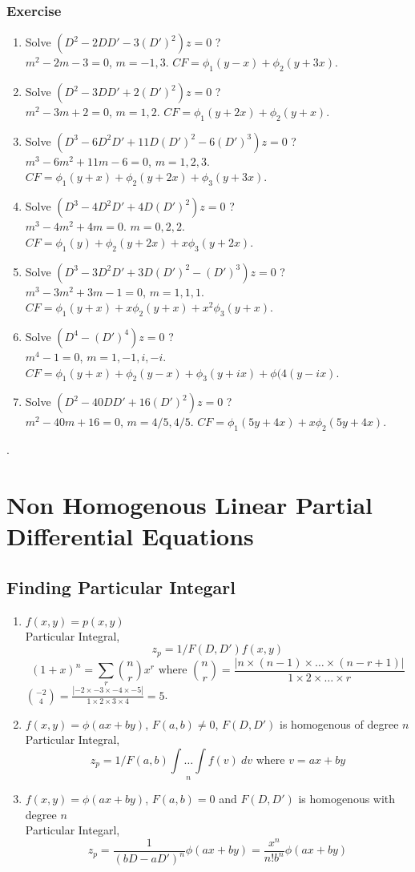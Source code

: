 \subsubsection*{Exercise} %
\begin{enumerate}
	\item Solve $(D^2-2DD' - 3(D')^2)z = 0$ ?\\
	$m^2 - 2m - 3 = 0$, $m = -1,3$.
	$CF = \phi_1(y-x) + \phi_2(y+3x)$.
	\item Solve $(D^2 -3DD' + 2(D')^2)z = 0$ ?\\
	$m^2 - 3m + 2 = 0$, $m = 1,2$.
	$CF = \phi_1(y+2x) + \phi_2(y+x)$.
	\item Solve $(D^3-6D^2D' + 11D(D')^2 - 6(D')^3)z = 0$ ?\\
	$m^3 - 6m^2 + 11m - 6 = 0$, $m = 1, 2, 3$.
	$CF = \phi_1(y+x) + \phi_2(y+2x) + \phi_3(y+3x)$.
	\item Solve  $(D^3 - 4D^2D' + 4D(D')^2)z = 0$ ?\\
	$m^3 - 4m^2 + 4m = 0$. $m = 0, 2,2$.
	$CF = \phi_1(y) + \phi_2(y+2x) + x\phi_3(y+2x)$.
	\item Solve $(D^3-3D^2D'+3D(D')^2 - (D')^3)z = 0$ ?\\
	$m^3 - 3m^2 + 3m -1 = 0$, $m = 1,1,1$.
	$CF = \phi_1(y+x) + x\phi_2(y+x) + x^2\phi_3(y+x)$.
	\item Solve $(D^4-(D')^4)z = 0$ ? \\
	$m^4 - 1 = 0$, $m = 1,-1,i,-i$.
	$CF = \phi_1(y+x) + \phi_2(y-x) + \phi_3(y+ix) + \phi(4(y-ix)$.
	\item Solve $(D^2 - 40DD' + 16(D')^2)z = 0$ ? \\
	$m^2 - 40m + 16 = 0$, $m = 4/5, 4/5$.
	$CF = \phi_1(5y+4x) + x\phi_2(5y+4x)$.
\end{enumerate}.

\section{Non Homogenous Linear Partial Differential Equations}
\subsection{Finding Particular Integarl}
\begin{enumerate}
	\item $f(x,y) = p(x,y)$\\
	Particular Integral, $$z_p = 1/F(D,D') f(x,y)$$
		$$(1+x)^n = \sum_r \binom{n}{r} x^r \text{ where } \binom{n}{r} = \frac{|n \times (n-1) \times \dots \times (n-r+1)|}{1 \times 2 \times \dots \times r}$$
		$\binom{-2}{4} = \frac{|-2 \times -3 \times -4 \times -5|}{1 \times 2 \times 3 \times 4} = 5$.
	\item $f(x,y) = \phi(ax+by)$, $F(a,b) \ne 0$, $F(D,D')$ is homogenous of degree $n$ \\
		Particular Integral, $$z_p = 1/F(a,b) \underset{n}{\int \dots \int} f(v)\ dv \text{ where } v = ax + by$$
	\item $f(x,y) = \phi(ax+by)$, $F(a,b) = 0$ and $F(D,D')$ is homogenous with degree $n$\\
		Particular Integarl, $$z_p = \frac{1}{(bD-aD')^n} \phi(ax+by) = \frac{x^n}{n! b^n} \phi(ax+by)$$
\end{enumerate}

